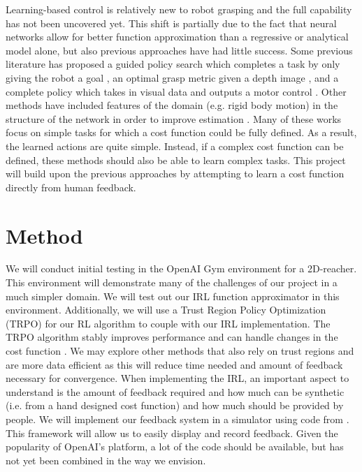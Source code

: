 \documentclass{article}
\begin{document}
    Learning-based control is relatively new to robot grasping and the full capability has not been uncovered yet.  This shift is partially due to the fact that neural networks allow for better function approximation than a regressive or analytical model alone, but also previous approaches have had little success.  Some previous literature has proposed a guided policy search which completes a task by only giving the robot a goal \cite{levine2015learning}, an optimal grasp metric given a depth image \cite{johns2016deep}, and a complete policy which takes in visual data and outputs a motor control \cite{gu2016deep}.  Other methods have included features of the domain (e.g. rigid body motion) in the structure of the network in order to improve estimation \cite{byravan2017se3}.  Many of these works focus on simple tasks for which a cost function could be fully defined.  As a result, the learned actions are quite simple.  Instead, if a complex cost function can be defined, these methods should also be able to learn complex tasks.  This project will build upon the previous approaches by attempting to learn a cost function directly from human feedback.

\section{Method}


    We will conduct initial testing in the OpenAI Gym environment for a 2D-reacher.  This environment will demonstrate many of the challenges of our project in a much simpler domain.  We will test out our IRL function approximator in this environment.  Additionally, we will use a Trust Region Policy Optimization (TRPO) \cite{SchulmanLMJA15} for our RL algorithm to couple with our IRL implementation.  The TRPO algorithm stably improves performance and can handle changes in the cost function \cite{Christiano2017}.  We may explore other methods that also rely on trust regions and are more data efficient as this will reduce time needed and amount of feedback necessary for convergence. When implementing the IRL, an important aspect to understand is the amount of feedback required and how much can be synthetic (i.e. from a hand designed cost function) and how much should be provided by people.  We will implement our feedback system in a simulator using code from \cite{Christiano2017}.  This framework will allow us to easily display and record feedback.  Given the popularity of OpenAI's platform, a lot of the code should be available, but has not yet been combined in the way we envision.
\end{document}
